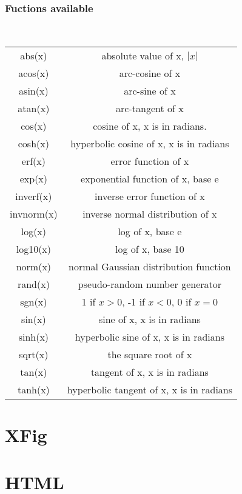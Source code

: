\documentclass{beamer}
\begin{document}
\begin{frame}
\frametitle{Fuctions available}\
\begin{center}
			\begin{tabular}{ c c }
			      abs(x)      &      absolute value of x, $|x|$\\
			      acos(x)     &    arc-cosine  of x\\
			      asin(x)     &      arc-sine    of x\\  
			      atan(x)     &      arc-tangent of x\\
			      cos(x)      &      cosine      of x,  x is in radians.\\
			      cosh(x)     &      hyperbolic cosine of x, x is in radians\\
			      erf(x)      &      error function of x\\
			      exp(x)      &      exponential function of x, base e\\
			      inverf(x)   &      inverse error function of x\\
			      invnorm(x)  &      inverse normal distribution of x\\
			      log(x)      &      log of x, base e\\
			      log10(x)    &      log of x, base 10\\
			      norm(x)     &      normal Gaussian distribution function\\
			      rand(x)     &      pseudo-random number generator      \\
			      sgn(x)      &      1 if $x > 0$, -1 if $x < 0$, 0 if $x=0$\\
			      sin(x)      &      sine      of x, x is in radians\\
			      sinh(x)     &      hyperbolic sine of x, x is in radians\\
			      sqrt(x)     &      the square root of x\\
			      tan(x)      &      tangent of x, x is in radians\\
			      tanh(x)     &      hyperbolic tangent of x, x is in radians  
			    \end{tabular}
			\end{center}
\end{frame}

\section{XFig}
\section{HTML}
\end{document}

